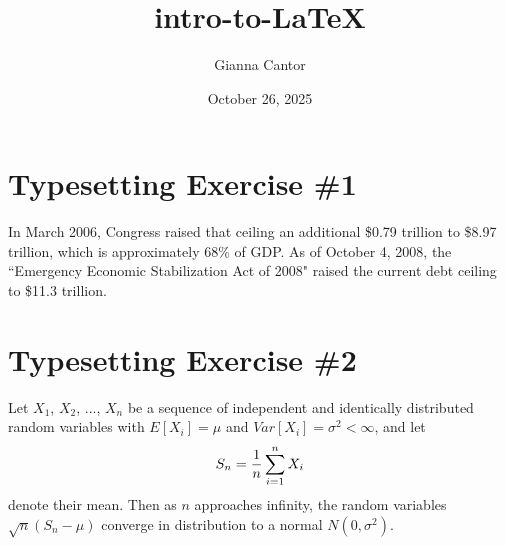 \documentclass{article}
\title{intro-to-LaTeX}
\author{Gianna Cantor}
\date{October 26, 2025}
\begin{document}
\maketitle

\section{Typesetting Exercise \#1}
In March 2006, Congress raised that ceiling an additional \$0.79 trillion to \$8.97 trillion, which is approximately 68\% of GDP. As of October 4, 2008, the ``Emergency Economic Stabilization Act of 2008" raised the current debt ceiling to \$11.3 trillion.

\section{Typesetting Exercise \#2}
Let $X_1$, $X_2$, ..., $X_n$ be a sequence of independent and identically distributed random variables with $E[X_i]=\mu$ and $Var[X_i]=\sigma^2<\infty$, and let
\begin{equation*}
    \centering
    S_n = \frac{1}{n} \sum_{i=1}^{n} X_i
\end{equation*}
denote their mean. Then as $n$ approaches infinity, the random variables $\sqrt{n}(S_n-\mu)$ converge in distribution to a normal $N(0, \sigma^2).$
\end{document}

